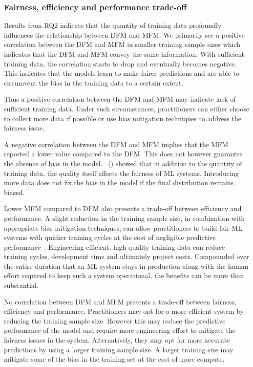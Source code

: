 \documentclass{article}
\newcommand{\citet}[1]{\citeauthor{#1}~(\citeyear{#1})}
\begin{document}
\subsubsection{Fairness, efficiency and performance trade-off}\label{sec:discuss-fair-eff-perf-trade}

Results from RQ2 indicate that the quantity of training data
profoundly influences the relationship between DFM and MFM. We
primarily see a positive correlation between the DFM and MFM in
smaller training sample sizes which indicates that the DFM and MFM
convey the same information. With sufficient training data, the
correlation starts to drop and eventually becomes negative. This
indicates that the models learn to make fairer predictions and are
able to circumvent the bias in the training data to a certain extent.

Thus a positive correlation between the DFM and MFM may indicate lack
of sufficient training data. Under such circumstances, practitioners
can either choose to collect more data if possible or use bias
mitigation techniques to address the fairness issue.

A negative correlation between the DFM and MFM implies that the MFM
reported a lower value compared to the DFM. This does not however
guarantee the absence of bias in the
model. \citet{zhang2021ignorance} showed that in addition to the
quantity of training data, the quality itself affects the fairness of
ML systems. Introducing more data does not fix the bias in the model
if the final distribution remains biased.

Lower MFM compared to DFM also presents a trade-off between efficiency
and performance. A slight reduction in the training sample size, in
combination with appropriate bias mitigation techniques, can allow
practitioners to build fair ML systems with quicker training cycles at
the cost of negligible predictive
performance \cite{verdecchia2022data}. Engineering efficient, high
quality training data can reduce training cycles, development time and
ultimately project costs. Compounded over the entire duration that an
ML system stays in production along with the human effort required to
keep such a system operational, the benefits can be more than
substantial.

No correlation between DFM and MFM presents a trade-off between
fairness, efficiency and performance. Practitioners may opt for a more
efficient system by reducing the training sample size. However this
may reduce the predictive performance of the model and require more
engineering effort to mitigate the fairness issues in the system.
Alternatively, they may opt for more accurate predictions by using a
larger training sample size. A larger training size may mitigate some
of the bias in the training set at the cost of more compute.
\end{document}

